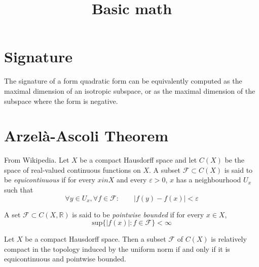 



\title{Basic math}
\maketitle

\label{section-phantom}

\tableofcontents

\section{Signature}
\label{section-signature}

The signature of a form quadratic form can be equivalently computed as the
maximal dimension of an isotropic subspace, or as the maximal dimension of the
subspace where the form is negative.

\section{Arzelà-Ascoli Theorem}
\label{section-Arzela-Ascoli-theorem}
\begin{definition}
\label{definition-equicontinuous}
From Wikipedia. Let $X$ be a compact Hausdorff space and let  $C(X)$ be the
space of real-valued continuous functions on $X$. A subset $\mathcal{F} \subset
C(X)$ is said to be {\it equicontinuous} if for every $x in X$ and every
$\varepsilon>0$, $x$ has a neighbourhood $U_x$ such that
$$
\forall y \in U_x, \forall f \in \mathcal{F}: \qquad |f(y)-f(x)|<\varepsilon
$$
\end{definition}

\begin{definition}
\label{definition-pointwise-bounded}
A set $\mathcal{F}\subset C(X,\mathbb{R})$ is said to be {\it pointwise
bounded} if for every $x \in X$,
$$
\text{sup}\{|f(x)|:f \in \mathcal{F}\}<\infty
$$
\end{definition}

\begin{theorem}
\label{theorem-Arzela-Ascoli}
Let $X$ be a compact Hausdorff space. Then a subset $\mathcal{F}$ of $C(X)$ is
relatively compact in the topology induced by the uniform norm if and only if it
is equicontinuous and pointwise bounded.
\end{theorem}






